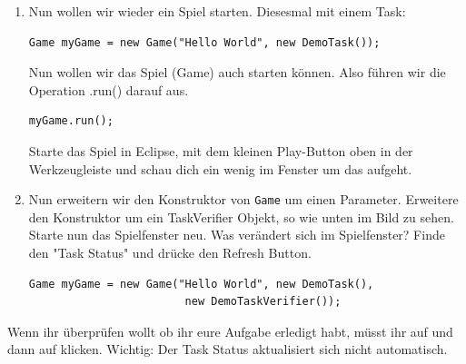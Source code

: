 

\begin{enumerate}
    \item Nun wollen wir wieder ein Spiel starten. Diesesmal mit einem Task:

    \begin{lstlisting}
Game myGame = new Game("Hello World", new DemoTask());
    \end{lstlisting}

    Nun wollen wir das Spiel (Game) auch starten können. Also führen wir die Operation .run() darauf aus.

    \begin{lstlisting}
myGame.run();
    \end{lstlisting}

    Starte das Spiel in Eclipse, mit dem kleinen Play-Button oben in der Werkzeugleiste und schau dich ein wenig im Fenster um das aufgeht.

    \item Nun erweitern wir den Konstruktor von \texttt{Game} um einen Parameter. Erweitere den Konstruktor um ein TaskVerifier Objekt, so wie unten im Bild zu sehen. Starte nun das Spielfenster neu. Was verändert sich im Spielfenster? Finde den "Task Status" und drücke den Refresh Button.

    \begin{lstlisting}
Game myGame = new Game("Hello World", new DemoTask(),
                        new DemoTaskVerifier());
    \end{lstlisting}

    \end{enumerate}
    \begin{Infobox}
    Wenn ihr überprüfen wollt ob ihr eure Aufgabe erledigt habt, müsst ihr auf  und dann auf  klicken.
    Wichtig: Der Task Status aktualisiert sich nicht automatisch.
    \end{Infobox}
